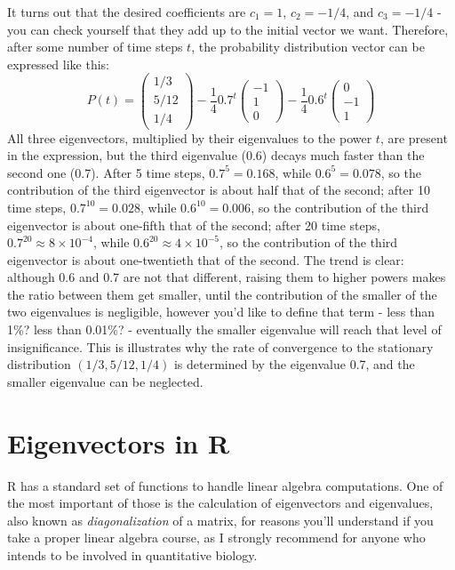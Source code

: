 \documentclass[
  letterpaper,
  DIV=11,
  numbers=noendperiod]{scrreprt}
\begin{document}
It turns out that the desired coefficients are \(c_1 = 1\),
\(c_2 = -1/4\), and \(c_3 = -1/4\) - you can check yourself that they
add up to the initial vector we want. Therefore, after some number of
time steps \(t\), the probability distribution vector can be expressed
like this:
\[ P(t) = \left(\begin{array}{c} 1/3     \\  5/12  \\ 1/4 \end{array}\right) -\frac{1}{4} 0.7^t \left(\begin{array}{c} -1   \\ 1  \\ 0 \end{array}\right)  -\frac{1}{4} 0.6^t \left(\begin{array}{c} 0  \\ -1  \\ 1 \end{array}\right)\]
All three eigenvectors, multiplied by their eigenvalues to the power
\(t\), are present in the expression, but the third eigenvalue (0.6)
decays much faster than the second one (0.7). After 5 time steps,
\(0.7^5 = 0.168\), while \(0.6^5 = 0.078\), so the contribution of the
third eigenvector is about half that of the second; after 10 time steps,
\(0.7^{10} = 0.028\), while \(0.6^{10} = 0.006\), so the contribution of
the third eigenvector is about one-fifth that of the second; after 20
time steps, \(0.7^{20} \approx 8 \times 10^{-4}\), while
\(0.6^{20} \approx 4 \times 10^{-5}\), so the contribution of the third
eigenvector is about one-twentieth that of the second. The trend is
clear: although 0.6 and 0.7 are not that different, raising them to
higher powers makes the ratio between them get smaller, until the
contribution of the smaller of the two eigenvalues is negligible,
however you'd like to define that term - less than 1\%? less than
0.01\%? - eventually the smaller eigenvalue will reach that level of
insignificance. This is illustrates why the rate of convergence to the
stationary distribution \((1/3, 5/12, 1/4)\) is determined by the
eigenvalue 0.7, and the smaller eigenvalue can be neglected.

\hypertarget{eigenvectors-in-r}{%
\section{Eigenvectors in R}\label{eigenvectors-in-r}}

R has a standard set of functions to handle linear algebra computations.
One of the most important of those is the calculation of eigenvectors
and eigenvalues, also known as \emph{diagonalization} of a matrix, for
reasons you'll understand if you take a proper linear algebra course, as
I strongly recommend for anyone who intends to be involved in
quantitative biology.
\end{document}
